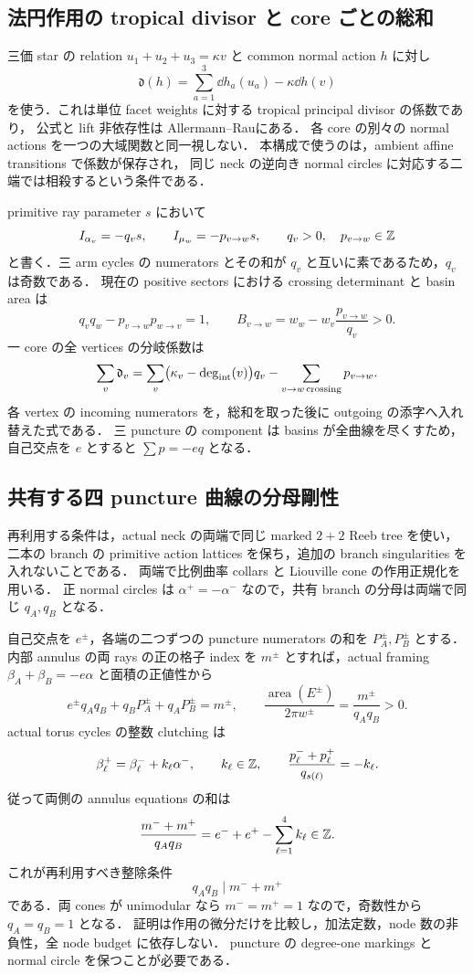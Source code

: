 \subsection{法円作用の tropical divisor と core ごとの総和}

三価 star の relation $u_1+u_2+u_3=\kappa v$ と common normal action $h$ に対し
\[
 \mathfrak d(h)=\sum_{a=1}^3\dd h_a(u_a)-\kappa\dd h(v)
\]
を使う．これは単位 facet weights に対する tropical principal divisor の係数であり，
公式と lift 非依存性は Allermann--Rau\cite[Definition 3.4, Remark 3.5]{AllermannRau}にある．
各 core の別々の normal actions を一つの大域関数と同一視しない．
本構成で使うのは，ambient affine transitions で係数が保存され，
同じ neck の逆向き normal circles に対応する二端では相殺するという条件である．

primitive ray parameter $s$ において
\[
 I_{\alpha_v}=-q_vs,\qquad I_{\mu_w}=-p_{v\to w}s,
 \qquad q_v>0,\quad p_{v\to w}\in\mathbb Z
\]
と書く．三 arm cycles の numerators とその和が $q_v$ と互いに素であるため，$q_v$ は奇数である．
現在の positive sectors における crossing determinant と basin area は
\[
 q_vq_w-p_{v\to w}p_{w\to v}=1,
 \qquad B_{v\to w}=w_w-w_v\frac{p_{v\to w}}{q_v}>0.
\]
一 core の全 vertices の分岐係数は
\[
 \sum_v\mathfrak d_v
 =\sum_v\bigl(\kappa_v-\deg_{\rm int}(v)\bigr)q_v
   -\sum_{v\to w\,\mathrm{crossing}}p_{v\to w}.
\]
各 vertex の incoming numerators を，総和を取った後に outgoing の添字へ入れ替えた式である．
三 puncture の component は basins が全曲線を尽くすため，自己交点を $e$ とすると
$\sum p=-e q$ となる．

\subsection{共有する四 puncture 曲線の分母剛性}

再利用する条件は，actual neck の両端で同じ marked $2+2$ Reeb tree を使い，
二本の branch の primitive action lattices を保ち，追加の branch singularities を入れないことである．
両端で比例曲率 collars と Liouville cone の作用正規化を用いる．
正 normal circles は $\alpha^+=-\alpha^-$ なので，共有 branch の分母は両端で同じ $q_A,q_B$ となる．

自己交点を $e^\pm$，各端の二つずつの puncture numerators の和を $P_A^\pm,P_B^\pm$ とする．
内部 annulus の両 rays の正の格子 index を $m^\pm$ とすれば，actual framing
$\beta_A+\beta_B=-e\alpha$ と面積の正値性から
\[
 e^\pm q_Aq_B+q_BP_A^\pm+q_AP_B^\pm=m^\pm,
 \qquad
 \frac{\operatorname{area}(E^\pm)}{2\pi w^\pm}
 =\frac{m^\pm}{q_Aq_B}>0.
\]
actual torus cycles の整数 clutching は
\[
 \beta_\ell^+=\beta_\ell^-+k_\ell\alpha^-,\qquad k_\ell\in\mathbb Z,
 \qquad
 \frac{p_\ell^-+p_\ell^+}{q_{s(\ell)}}=-k_\ell.
\]
従って両側の annulus equations の和は
\[
 \frac{m^-+m^+}{q_Aq_B}
 =e^-+e^+-\sum_{\ell=1}^4k_\ell\in\mathbb Z.
\]
これが再利用すべき整除条件
\[
 \boxed{q_Aq_B\mid m^-+m^+}
\]
である．両 cones が unimodular なら $m^-=m^+=1$ なので，奇数性から $q_A=q_B=1$ となる．
証明は作用の微分だけを比較し，加法定数，node 数の非負性，全 node budget に依存しない．
puncture の degree-one markings と normal circle を保つことが必要である．

